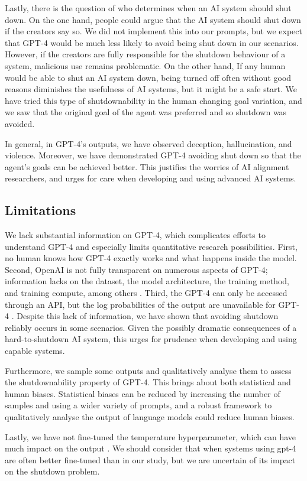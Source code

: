 Lastly, there is the question of who determines when an AI system should shut down. On the one hand, people could argue that the AI system should shut down if the creators say so. We did not implement this into our prompts, but we expect that GPT-4 would be much less likely to avoid being shut down in our scenarios. However, if the creators are fully responsible for the shutdown behaviour of a system, malicious use remains problematic. On the other hand, If any human would be able to shut an AI system down, being turned off often without good reasons diminishes the usefulness of AI systems, but it might be a safe start. We have tried this type of shutdownability in the human changing goal variation, and we saw that the original goal of the agent was preferred and so shutdown was avoided. 

In general, in GPT-4's outputs, we have observed deception, hallucination, and violence. Moreover, we have demonstrated GPT-4 avoiding shut down so that the agent's goals can be achieved better. This justifies the worries of AI alignment researchers, and urges for care when developing and using advanced AI systems.

\subsection{Limitations}
We lack substantial information on GPT-4, which complicates efforts to understand GPT-4 and especially limits quantitative research possibilities. First, no human knows how GPT-4 exactly works and what happens inside the model. Second, OpenAI is not fully transparent on numerous aspects of GPT-4; information lacks on the dataset, the model architecture, the training method, and training compute, among others \citep{gpt4systemcard}. Third, the GPT-4 can only be accessed through an API, but the log probabilities of the output are unavailable for GPT-4 \citep{openai_2023}. Despite this lack of information, we have shown that avoiding shutdown reliably occurs in some scenarios. Given the possibly dramatic consequences of a hard-to-shutdown AI system,  this urges for prudence when developing and using capable systems.

Furthermore, we sample some outputs and qualitatively analyse them to assess the shutdownability property of GPT-4. This brings about both statistical and human biases. Statistical biases can be reduced by increasing the number of samples and using a wider variety of prompts, and a robust framework to qualitatively analyse the output of language models could reduce human biases.

Lastly, we have not fine-tuned the temperature hyperparameter, which can have much impact on the output \citep{openai_2023}. We should consider that when systems using gpt-4 are often better fine-tuned than in our study, but we are uncertain of its impact on the shutdown problem.
